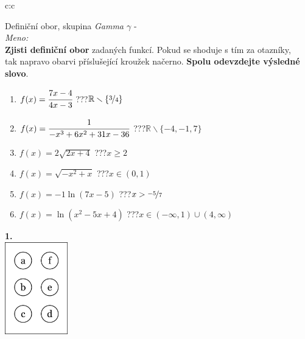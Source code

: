 \documentclass[10pt]{report}
\begin{document}
\begin{tabular}{c:c}
\begin{minipage}[c][99mm][t]{0.49\linewidth}
\begin{center}
\vspace{7mm}
{\huge Definiční obor, skupina \textit{Gamma $\gamma$} -}\\[4.5mm]
\textit{Meno:}\phantom{xxxxxxxxxxxxxxxxxxxxxxxxxxxxxxxxxxxxxxxxxxxxxxxxxxxxxxxxxxxxxxxxx}\\[3.5mm]
\textbf{Zjisti definiční obor} zadaných funkcí. Pokud se shoduje s tím za otazníky,\\tak napravo obarvi příslušející kroužek načerno. \textbf{Spolu odevzdejte výsledné slovo}.\\[3mm]
\begin{minipage}{0.77\linewidth}
\begin{center}
\begin{varwidth}{\textwidth}
\begin{enumerate}
\normalsize
\item $f(x)=\cfrac{7x-4}{4x-3}$\quad \dotfill\; ???\;\dotfill \quad $\mathbb{R}\smallsetminus\{\nicefrac{3}{4}\}$
\item $f(x)=\cfrac{1}{-x^3+6x^2+31x-36}$\quad \dotfill\; ???\;\dotfill \quad $\mathbb{R}\smallsetminus\{-4,-1,7\}$
\item $f(x)=2\sqrt{2x+4}$\quad \dotfill\; ???\;\dotfill \quad $x\geq2$
\item $f(x)=\sqrt{-x^2+x}$\quad \dotfill\; ???\;\dotfill \quad $x\in(0 , 1)$
\item $f(x)=-1\ln{(7x-5)}$\quad \dotfill\; ???\;\dotfill \quad $x>\nicefrac{-5}{7}$
\item $f(x)=\ln{(x^2-5x+4)}$\quad \dotfill\; ???\;\dotfill \quad $x\in(-\infty , 1)\cup(4 , \infty)$
\end{enumerate}
\end{varwidth}
\end{center}
\end{minipage}
\begin{minipage}{0.20\linewidth}
\begin{center}
{\Huge\bfseries 1.} \\[2mm]
\includegraphics[height=40mm]{../images/braille.png}

\end{center}
\end{minipage}
\end{center}
\end{minipage}
\end{tabular}
\end{document}
